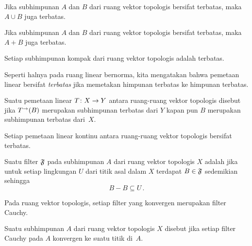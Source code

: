 \begin{prop} Jika subhimpunan $A$ dan $B$ dari ruang vektor topologis bersifat terbatas, maka $A \cup B$ juga terbatas.
\end{prop}

\begin{prop} Jika subhimpunan $A$ dan $B$ dari ruang vektor topologis bersifat terbatas, maka $A + B$ juga terbatas.
\end{prop}

\begin{prop} Setiap subhimpunan kompak dari ruang vektor topologis adalah terbatas.
\end{prop}

Seperti halnya pada ruang linear bernorma, kita mengatakan bahwa pemetaan linear bersifat \emph{terbatas} jika memetakan himpunan terbatas ke himpunan terbatas.

\begin{defn} Suatu pemetaan linear $T\colon X \rightarrow Y$ antara ruang-ruang vektor topologis disebut
 jika $T^\rightarrow(B)$ merupakan subhimpunan terbatas dari $Y$ kapan pun $B$ merupakan subhimpunan terbatas dari~$X$.
\end{defn}

\begin{prop} Setiap pemetaan linear kontinu antara ruang-ruang vektor topologis bersifat terbatas.
\end{prop}

\begin{defn} Suatu filter $\mathfrak{F}$ pada subhimpunan $A$ dari ruang vektor topologis $X$ adalah
 jika untuk setiap lingkungan $U$ dari titik asal dalam $X$ terdapat $B \in \mathfrak{F}$ sedemikian sehingga
   \[ B - B \subseteq U\,. \]
\end{defn}

\begin{prop} Pada ruang vektor topologis, setiap filter yang konvergen merupakan filter Cauchy.
\end{prop}

\begin{defn} Suatu subhimpunan $A$ dari ruang vektor topologis $X$ disebut
 jika setiap filter Cauchy pada $A$ konvergen ke suatu titik di~$A$.
\end{defn}

